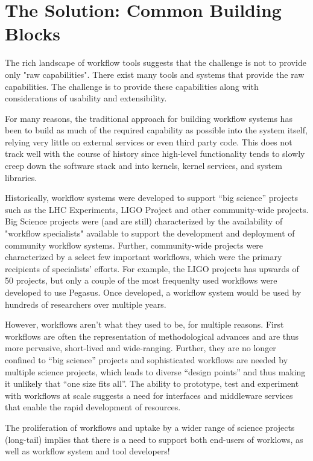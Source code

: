 \section{The Solution: Common Building Blocks}\label{buildings-blocks}

The rich landscape of workflow tools suggests that the  challenge is not to
provide only "raw capabilities". There exist many tools and systems that
provide the raw capabilities. The challenge is to provide these capabilities
along with considerations of usability and extensibility.

For many reasons, the traditional approach for building workflow systems has
been to build as much of the required capability as possible into the system
itself, relying very little on external services or even third party code.
This does not track well with the course of history since high-level
functionality tends to slowly creep down the software stack and into kernels,
kernel services, and system libraries.

Historically, workflow systems were developed to support “big science”
projects such as the LHC Experiments, LIGO Project and other community-wide
projects. Big Science projects were (and are still) characterized by the
availability of "workflow specialists" available to support the  development
and deployment of community workflow systems. Further, community-wide projects
were characterized by a select few important workflows, which were the primary
recipients of specialists' efforts. For example, the LIGO projects has upwards
of 50 projects, but only a couple of the most frequenlty used workflows were
developed to use Pegasus. Once developed, a workflow system would be used by
hundreds of researchers over multiple years. 

However, workflows aren’t what they used to be, for multiple reasons. First
workflows are often the representation of methodological advances and are thus
more pervasive, short-lived and wide-ranging. Further, they are no longer
confined to “big science” projects and sophisticated workflows are needed by
multiple science projects, which leads to diverse “design points” and thus
making it unlikely that “one size fits all”.  The ability to prototype, test
and experiment with workflows at scale suggests a need for interfaces and
middleware services that enable the rapid development of resources.

The proliferation of workflows and uptake by a wider range of science projects
(long-tail) implies that there is a need to support both end-users of worklows,
as well as workflow system and tool developers!

